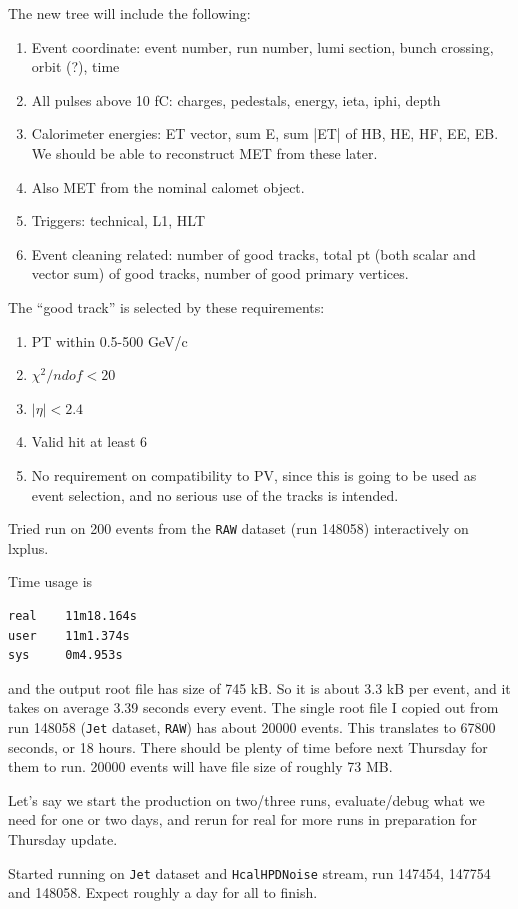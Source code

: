 

The new tree will include the following:

\begin{enumerate}
\item Event coordinate: event number, run number, lumi section, bunch crossing, orbit (?), time
\item All pulses above 10 fC: charges, pedestals, energy, ieta, iphi, depth
\item Calorimeter energies: ET vector, sum E, sum |ET| of HB, HE, HF, EE, EB.  We should be able to reconstruct MET from these later.
\item Also MET from the nominal calomet object.
\item Triggers: technical, L1, HLT
\item Event cleaning related: number of good tracks, total pt (both scalar and vector sum) of good tracks, number of good primary vertices.
\end{enumerate}

The ``good track'' is selected by these requirements:

\begin{enumerate}
\item PT within 0.5-500 GeV/c
\item $\chi^2/ndof < 20$
\item $|\eta| < 2.4$
\item Valid hit at least 6
\item No requirement on compatibility to PV, since this is going to be used as event selection, and no serious use of the tracks is intended.
\end{enumerate}


Tried run on 200 events from the \texttt{RAW}  dataset (run 148058) interactively on lxplus.

Time usage is

\begin{verbatim}
real    11m18.164s
user    11m1.374s
sys     0m4.953s
\end{verbatim}

and the output root file has size of 745 kB.  So it is about 3.3 kB per event, and it takes on average 3.39 seconds every event.
The single root file I copied out from run 148058 (\texttt{Jet} dataset, \texttt{RAW}) has about 20000 events.  This translates to 67800 seconds, or 18 hours.
There should be plenty of time before next Thursday for them to run.  20000 events will have file size of roughly 73 MB.

Let's say we start the production on two/three runs, evaluate/debug what we need for one or two days, and rerun for real for more runs in preparation for Thursday update.

Started running on \texttt{Jet} dataset and \texttt{HcalHPDNoise} stream, run 147454, 147754 and 148058.  Expect roughly a day for all to finish.


